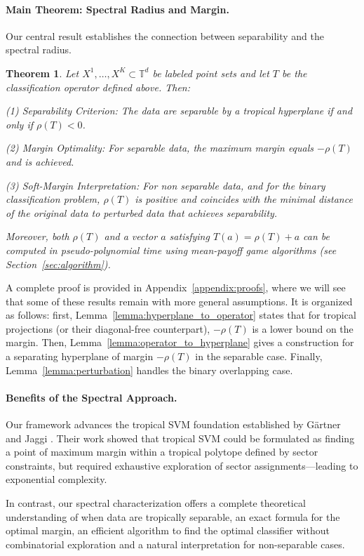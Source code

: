 \documentclass{article}
\newtheorem{theorem}{Theorem}
\newcommand{\trop}{\mathbb{T}}
\begin{document}
\paragraph{Main Theorem: Spectral Radius and Margin.}
Our central result establishes the connection between separability and the spectral radius. 
\begin{theorem}\label{thm:spectral_separability}
Let $X^1,\ldots,X^K \subset \trop^d$ be labeled point sets and let $T$ be the classification operator defined above. Then:

(1) \textit{Separability Criterion:} The data are separable by a tropical hyperplane if and only if $\rho(T) < 0$.

(2) \textit{Margin Optimality:} For separable data, the maximum margin equals $-\rho(T)$ and is achieved.

(3) \textit{Soft-Margin Interpretation:} For non separable data, and for the binary classification problem, $\rho(T)$ is positive and coincides with the minimal distance of the original data to perturbed data that achieves separability.

Moreover, both $\rho(T)$ and a vector $a$ satisfying $T(a) = \rho(T)+a$ can be computed in pseudo-polynomial time using mean-payoff game algorithms (see Section~\ref{sec:algorithm}).
\end{theorem}
A complete proof is provided in Appendix~\ref{appendix:proofs}, where we will see that some of these results remain with more general assumptions.
It is organized as follows: first, Lemma~\ref{lemma:hyperplane_to_operator} states that for tropical projections (or their diagonal-free counterpart), $-\rho(T)$ is a lower bound on the margin.
Then, Lemma~\ref{lemma:operator_to_hyperplane} gives a construction for a separating hyperplane of margin $-\rho(T)$ in the separable case. Finally, Lemma~\ref{lemma:perturbation} handles the binary overlapping case.

\paragraph{Benefits of the Spectral Approach.} 
Our framework advances the tropical SVM foundation established by Gärtner and Jaggi \cite{gartner2008}. Their work showed that tropical SVM could be formulated as finding a point of maximum margin within a tropical polytope defined by sector constraints, but required exhaustive exploration of sector assignments—leading to exponential complexity.

In contrast, our spectral characterization offers a complete theoretical understanding of when data are tropically separable, an exact formula for the optimal margin, an efficient algorithm to find the optimal classifier without combinatorial exploration and a natural interpretation for non-separable cases.
\end{document}
